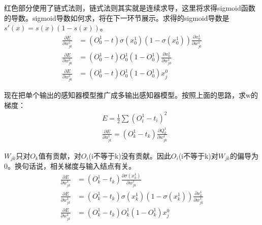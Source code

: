 \documentclass{ctexart}
\begin{document}
\par 红色部分使用了链式法则，链式法则其实就是连续求导，这里将求得sigmoid函数的导数。sigmoid导数如何求，将在下一环节展示。求得的sigmoid导数是$s\prime(x) = s(x)(1 - s(x))$。
\begin{equation}
    \begin{aligned}
        \frac{\partial E}{\partial w_{j 0}^{1}} & =\left(O_{0}^{1}-t\right) \sigma\left(x_{0}^{1}\right)\left(1-\sigma\left(x_{0}^{1}\right)\right) \frac{\partial x_{0}^{1}}{\partial w_{j 0}^{1}} \\
        \frac{\partial E}{\partial w_{j 0}^{1}} & =\left(O_{0}^{1}-t\right) O_{0}^{1}\left(1-O_{0}^{1}\right) \frac{\partial x_{0}^{1}}{\partial w_{j 0}^{1}}                                       \\
        \frac{\partial E}{\partial w_{j 0}^{1}} & =\left(O_{0}^{1}-t\right) O_{0}^{1}\left(1-O_{0}^{1}\right) x_{j}^{0}
    \end{aligned}
\end{equation}
\par 现在把单个输出的感知器模型推广成多输出感知器模型。按照上面的思路，求w的梯度：
\begin{equation}
    \begin{aligned}
         & E=\frac{1}{2} \sum\left(O_{i}^{1}-t_{i}\right)^{2}                                                                    \\
         & \frac{\partial E}{\partial u_{j k}^{1}}=\left(O_{k}^{1}-t_{k}\right) \frac{\partial Q_{ k}^{1}}{\partial w_{j k}^{1}}
    \end{aligned}
\end{equation}
\par $W_{j k}$只对$O_{k}$值有贡献，对$O_{i}$(i不等于k)没有贡献。因此$O_{i}$(i不等于k)对$W_{j k}$的偏导为0。换句话说，相关梯度与输入结点有关。
\begin{equation}
    \begin{aligned}
        \frac{\partial E}{\partial w_{j k}^{1}} & =\left(O_{k}^{1}-t_{k}\right) \frac{\partial \sigma\left(x_{k}^{1}\right)}{\partial w_{j k}^{1}}                                                             \\
        \frac{\partial E}{\partial w_{j k}^{1}} & =\left(O_{k}^{1}-t_{k}\right) \sigma\left(x_{k}^{1}\right)\left(1-\sigma\left(x_{k}^{1}\right)\right) \frac{\partial x_{k}^{1}}{\partial w_{j k}^{1}} \\
        \frac{\partial E}{\partial w_{j k}^{1}} & =\left(O_{k}^{1}-t_{k}\right) O_{k}^{1}\left(1-O_{k}^{1}\right) x_{j}^{0}
    \end{aligned}
\end{equation}
\end{document}
